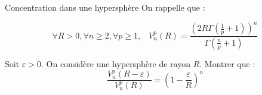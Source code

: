 \documentclass{beamer}
\begin{document}
\begin{frame}{}{Concentration dans une hypersphère}
	On rappelle que :
	
	\begin{equation*}
		\forall R>0, \forall n\geqslant 2, \forall p\geqslant 1, \; \; \; V_n^p(R) = \frac{\left(2R\Gamma\left(\frac{1}{p}+1\right)\right)^n}{\Gamma\left(\frac{n}{p}+1\right)} 
	\end{equation*}
	
	\begin{exercice}
		Soit $\varepsilon > 0$. On considère une hypersphère de rayon $R$. Montrer que :
			\begin{equation*} 
				\frac{V_n^p(R - \varepsilon)}{V_n^p(R)} = \left(1- \frac{\varepsilon}{R}\right)^n 
			\end{equation*}
	\end{exercice}
\end{frame}
\end{document}

